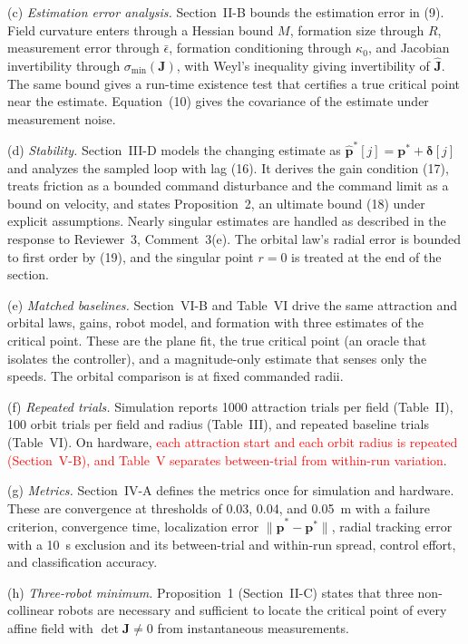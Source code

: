 \documentclass[10pt]{article}
\newcommand{\syn}[1]{\textcolor{red}{#1}}            %
\begin{document}
(c) \emph{Estimation error analysis.} Section~II-B bounds the estimation error in (9). Field curvature enters through a Hessian bound $M$, formation size through $R$, measurement error through $\bar{\epsilon}$, formation conditioning through $\kappa_0$, and Jacobian invertibility through $\sigma_{\min}(\mathbf{J})$, with Weyl's inequality giving invertibility of $\hat{\mathbf{J}}$. The same bound gives a run-time existence test that certifies a true critical point near the estimate. Equation~(10) gives the covariance of the estimate under measurement noise.

(d) \emph{Stability.} Section~III-D models the changing estimate as $\hat{\mathbf{p}}^*[j] = \mathbf{p}^* + \boldsymbol{\delta}[j]$ and analyzes the sampled loop with lag (16). It derives the gain condition (17), treats friction as a bounded command disturbance and the command limit as a bound on velocity, and states Proposition~2, an ultimate bound (18) under explicit assumptions. Nearly singular estimates are handled as described in the response to Reviewer~3, Comment~3(e). The orbital law's radial error is bounded to first order by (19), and the singular point $r = 0$ is treated at the end of the section.

(e) \emph{Matched baselines.} Section~VI-B and Table~VI drive the same attraction and orbital laws, gains, robot model, and formation with three estimates of the critical point. These are the plane fit, the true critical point (an oracle that isolates the controller), and a magnitude-only estimate that senses only the speeds. The orbital comparison is at fixed commanded radii.

(f) \emph{Repeated trials.} Simulation reports 1000 attraction trials per field (Table~II), 100 orbit trials per field and radius (Table~III), and repeated baseline trials (Table~VI). On hardware, \syn{each attraction start and each orbit radius is repeated (Section~V-B), and Table~V separates between-trial from within-run variation}.

(g) \emph{Metrics.} Section~IV-A defines the metrics once for simulation and hardware. These are convergence at thresholds of 0.03, 0.04, and 0.05~m with a failure criterion, convergence time, localization error $\|\hat{\mathbf{p}}^* - \mathbf{p}^*\|$, radial tracking error with a 10~s exclusion and its between-trial and within-run spread, control effort, and classification accuracy.

(h) \emph{Three-robot minimum.} Proposition~1 (Section~II-C) states that three non-collinear robots are necessary and sufficient to locate the critical point of every affine field with $\det\mathbf{J} \neq 0$ from instantaneous measurements.
\end{document}
